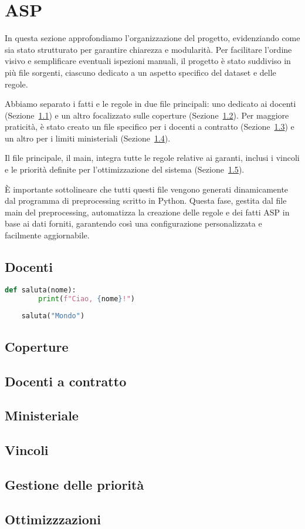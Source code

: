 \section{ASP}\label{sec:asp}

In questa sezione approfondiamo l'organizzazione del progetto, evidenziando 
come sia stato strutturato per garantire chiarezza e modularità. 
Per facilitare l'ordine visivo e semplificare eventuali ispezioni manuali, 
il progetto è stato suddiviso in più file sorgenti, ciascuno dedicato a un 
aspetto specifico del dataset e delle regole.

Abbiamo separato i fatti e le regole in due file principali: uno dedicato 
ai docenti (Sezione~\ref*{sec:rules-docenti}) e un altro focalizzato sulle 
coperture (Sezione~\ref*{sec:rules-coperture}). Per maggiore praticità, è 
stato creato un file specifico per i docenti a contratto 
(Sezione~\ref*{sec:rules-docenti-contratto}) e un altro per i limiti 
ministeriali (Sezione~\ref*{sec:rules-ministeriale}).

Il file principale, il main, integra tutte le regole relative ai garanti, 
inclusi i vincoli e le priorità definite per l'ottimizzazione del sistema 
(Sezione~\ref*{sec:constraints}).

È importante sottolineare che tutti questi file vengono generati dinamicamente 
dal programma di preprocessing scritto in Python. Questa fase, gestita dal 
file main del preprocessing, automatizza la creazione delle regole e dei 
fatti ASP in base ai dati forniti, garantendo così una configurazione 
personalizzata e facilmente aggiornabile. 


\subsection{Docenti}\label{sec:rules-docenti}
\begin{lstlisting}[language=Python, caption={Esempio di codice Python}]
    def saluta(nome):
        print(f"Ciao, {nome}!")
    
    saluta("Mondo")
\end{lstlisting}


\subsection{Coperture}\label{sec:rules-coperture}
\subsection{Docenti a contratto}\label{sec:rules-docenti-contratto}
\subsection{Ministeriale}\label{sec:rules-ministeriale}


\subsection{Vincoli}\label{sec:constraints}
\subsection{Gestione delle priorità}\label{sec:priorita}
\subsection{Ottimizzzazioni}\label{sec:optimizations}